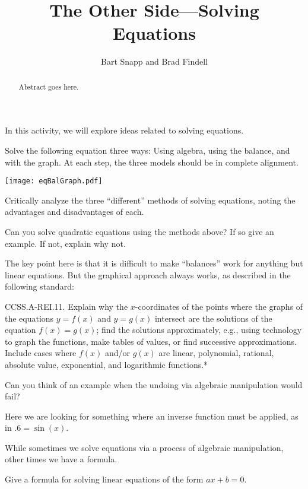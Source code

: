 \documentclass{ximera}
\title{The Other Side---Solving Equations}
\author{Bart Snapp and Brad Findell}
\begin{document}
\begin{abstract}
Abstract goes here.  
\end{abstract}
\maketitle

\label{A:otherSide}


In this activity, we will explore ideas related to solving equations.


\begin{problem}
Solve the following equation three ways: Using algebra, using the
balance, and with the graph. At each step, the three models should be in
complete alignment.
\begin{image}
\texttt{[image: eqBalGraph.pdf]}
\end{image}
\end{problem}


\begin{problem}
Critically analyze the three ``different'' methods of solving
equations, noting the advantages and disadvantages of each. 
\end{problem}

\begin{problem}
Can you solve quadratic equations using the methods above?
If so give an example. If not, explain why not.
\end{problem}

\begin{teachingnote}
The key point here is that it is difficult to make ``balances'' work for anything but linear equations.  But the graphical approach always works, as described in the following standard:  

CCSS.A-REI.11.  Explain why the $x$-coordinates of the points where the graphs of the equations $y = f(x)$ and $y = g(x)$ intersect are the solutions of the equation $f(x) = g(x)$; find the solutions approximately, e.g., using technology to graph the functions, make tables of values, or find successive approximations. Include cases where $f(x)$ and/or $g(x)$ are linear, polynomial, rational, absolute value, exponential, and logarithmic functions.*
\end{teachingnote}


\begin{problem}
Can you think of an example when the undoing via algebraic
manipulation would fail?
\end{problem}

\begin{teachingnote}
Here we are looking for something where an inverse function must be
applied, as in $.6 = \sin(x)$.
\end{teachingnote}


While sometimes we solve equations via a process of algebraic
manipulation, other times we have a formula.


\begin{problem}
Give a formula for solving linear equations of the form $ax + b =0$.
\end{problem}
\end{document}
